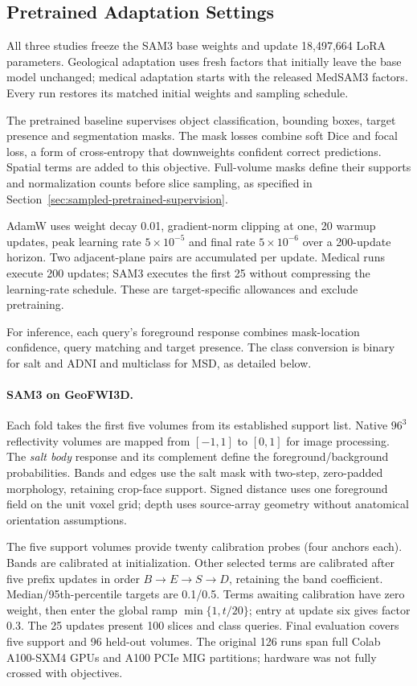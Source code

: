 \documentclass[12pt,a4paper]{article}
\begin{document}
\subsection{Pretrained Adaptation Settings}
\label{sec:adaptation-implementation}

All three studies freeze the SAM3 base weights and update 18,497,664
LoRA parameters. Geological adaptation uses fresh factors that initially
leave the base model unchanged; medical adaptation starts with the
released MedSAM3 factors. Every run restores its matched initial
weights and sampling schedule.

The pretrained baseline supervises object classification, bounding
boxes, target presence and segmentation masks. The mask losses combine
soft Dice and focal loss, a form of cross-entropy that downweights
confident correct predictions. Spatial terms are added to this
objective. Full-volume masks define their supports and normalization
counts before slice sampling, as specified in
Section~\ref{sec:sampled-pretrained-supervision}.

AdamW uses weight decay 0.01, gradient-norm clipping at one, 20 warmup
updates, peak learning rate $5\times10^{-5}$ and final rate
$5\times10^{-6}$ over a 200-update horizon. Two adjacent-plane pairs
are accumulated per update. Medical runs execute 200 updates; SAM3
executes the first 25 without compressing the learning-rate schedule.
These are target-specific allowances and exclude pretraining.

For inference, each query's foreground response combines mask-location
confidence, query matching and target presence. The class conversion
is binary for salt and ADNI and multiclass for MSD, as detailed below.

\paragraph{SAM3 on GeoFWI3D.}\label{sec:sam3-methods-details}
Each fold takes the first five volumes from its established support
list. Native $96^3$ reflectivity volumes are mapped from $[-1,1]$ to
$[0,1]$ for image processing. The \emph{salt body} response and its
complement define the foreground/background probabilities. Bands and
edges use the salt mask with two-step, zero-padded morphology, retaining
crop-face support. Signed distance uses one foreground field on the
unit voxel grid; depth uses source-array geometry without anatomical
orientation assumptions.

The five support volumes provide twenty calibration probes (four
anchors each). Bands are calibrated at initialization. Other selected
terms are calibrated after five prefix updates in order $B\to E\to S\to D$,
retaining the band coefficient. Median/95th-percentile targets are
0.1/0.5. Terms awaiting calibration have zero weight, then enter the
global ramp $\min\{1,t/20\}$; entry at update six gives factor 0.3.
The 25 updates present 100 slices and class queries. Final evaluation
covers five support and 96 held-out volumes. The original 126 runs
span full Colab A100-SXM4 GPUs and A100 PCIe MIG partitions;
hardware was not fully crossed with objectives.
\end{document}
